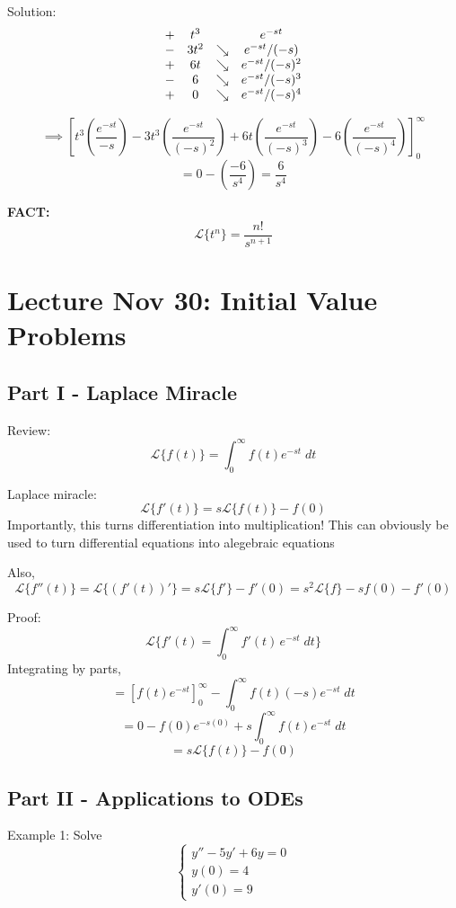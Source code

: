 \documentclass[12pt]{article}
\renewcommand{\L}[1]{\mathcal{L}\{#1\}}
\begin{document}
Solution:
\[\begin{array}{c c c c}
    + & t^3 & & e^{-st}\\
    - & 3t^2 & \searrow  & e^{-st} / (-s)\\
    + & 6t & \searrow  & e^{-st} / (-s)^2\\
    - & 6 & \searrow  & e^{-st} / (-s)^3\\
    + & 0 & \searrow  & e^{-st} / (-s)^4\\
\end{array}\]

\[\implies \left[t^3 \left(\frac{e^{-st}}{-s}\right) - 3t^3 \left(\frac{e^{-st}}{(-s)^2}\right) + 6t \left(\frac{e^{-st}}{(-s)^3}\right) - 6 \left(\frac{e^{-st}}{(-s)^4}\right)\right]_0^\infty\] 
\[= 0 - (\frac{-6}{s^4}) = \boxed{\frac{6}{s^4}}\]

\textbf{FACT:}
\[\boxed{\L{t^n} = \frac{n!}{s^{n+1}}}\]

\section{Lecture Nov 30: Initial Value Problems}
\subsection*{Part I - Laplace Miracle}
Review:
\[\L{f(t)} = \int_0^\infty f(t) e^{-st} \; dt\]

Laplace miracle:
\[\L{f'(t)} = s\L{f(t)} - f(0)\]
Importantly, this turns differentiation into multiplication! This can obviously be used to turn differential equations into alegebraic equations 

Also, 
\[\L{f''(t)} = \L{(f'(t))'} = s\L{f'} - f'(0) = s^2 \L{f} - sf(0) - f'(0)\]

Proof: 
\[\L{f'(t) = \int_0^\infty  f'(t) \, e^{-st}\; dt}\]
Integrating by parts,
\[= \left[f(t) e^{-st}\right]_0^\infty - \int_0^\infty f(t) (-s)e^{-st} \; dt \]
\[= 0 - f(0) e^{-s (0)} + s \int_0^\infty f(t) e^{-st}\; dt\]
\[= s\L{f(t)} - f(0)\]

\subsection*{Part II - Applications to ODEs}
Example 1: Solve
\[\begin{cases}
    y'' - 5y' + 6y = 0\\
    y(0) = 4\\
    y'(0) = 9
\end{cases}\]
\end{document}
